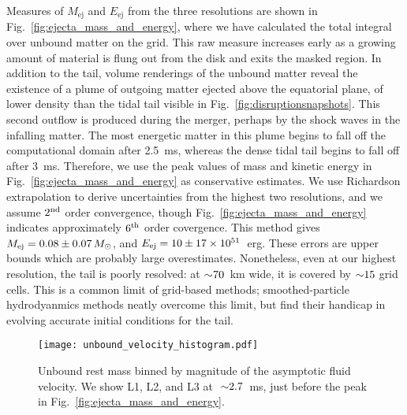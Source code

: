 Measures of $M_{\text{ej}}$ and $E_{\text{ej}}$ from the three resolutions
are shown in Fig.~\ref{fig:ejecta_mass_and_energy}, where we have calculated the total integral
over unbound matter on the grid.
This raw measure increases early as a growing amount of material
is flung out from the disk and exits the masked region.
In addition to the tail, volume renderings of the unbound matter reveal the existence of
a plume of outgoing matter ejected above the equatorial plane, of lower density than the tidal tail visible
in Fig.~\ref{fig:disruptionsnapshots}.  This second outflow is produced during
the merger, perhaps by the shock waves in the infalling matter. 
The most energetic matter in this plume begins to fall off the
computational domain after 2.5~ms, whereas the dense tidal tail begins to fall off
after 3~ms. Therefore, we use the peak values of mass and kinetic energy in
Fig.~\ref{fig:ejecta_mass_and_energy} as conservative estimates.
We use Richardson extrapolation to derive uncertainties from the highest two resolutions,
and we assume $2^{\rm nd}$ order convergence, though Fig.~\ref{fig:ejecta_mass_and_energy}
indicates approximately $6^{\rm th}$ order covergence. This method gives
$M_{\rm ej}= 0.08 \pm 0.07 \,M_{\odot}$, and
$E_{\rm ej} = 10 \pm 17 \times 10^{51}$~erg.
These errors are upper bounds which are probably large overestimates.
Nonetheless, even at our highest resolution, the tail is poorly resolved:
at $\mathord{\sim}70$~km wide, it is covered by $\mathord{\sim}15$ grid cells. This is a common limit
of grid-based methods; smoothed-particle hydrodyanmics methods neatly overcome this
limit, but find their handicap in evolving accurate initial conditions for the tail.

\begin{figure}
\texttt{[image: unbound\_velocity\_histogram.pdf]}
\caption{
Unbound rest mass binned by magnitude of the asymptotic fluid velocity.
We show L1, L2, and L3 at $~\mathord{\sim}2.7$~ms, just before the peak in
Fig.~\ref{fig:ejecta_mass_and_energy}.
}
\label{fig:ejecta_velocity_histogram}
\end{figure}

